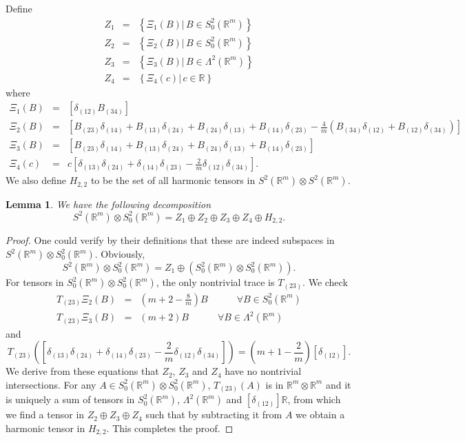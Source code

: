 \documentclass{amsart}
\newtheorem{lem}[thm]{Lemma}
\newcommand{\set}[1]{\left\{#1\right\}}
\newcommand{\Real}{\mathbb R}
\numberwithin{equation}{section}
\begin{document}
Define
\begin{eqnarray*}
	Z_1&=& \set{ \Xi_1(B)|\, B\in S^2_0(\Real^m)}\\
	Z_2&=& \set{ \Xi_2(B)|\, B\in S^2_0(\Real^m)}\\
	Z_3&=& \set{\Xi_3(B)|\, B\in \Lambda^2(\Real^m)}\\
	Z_4&=& \set{ \Xi_4(c)|\, c\in \Real} 
\end{eqnarray*}
where
\begin{eqnarray*}
	\Xi_1(B)&=& [\delta_{(12)}B_{(34)}] \\
	\Xi_2(B)&=& [B_{(23)}\delta_{(14)}+ B_{(13)}\delta_{(24)}+B_{(24)}\delta_{(13)}+B_{(14)}\delta_{(23)}-\frac{4}{m} (B_{(34)}\delta_{(12)}+B_{(12)}\delta_{(34)})]\\
	\Xi_3(B)&=& [B_{(23)}\delta_{(14)}+ B_{(13)}\delta_{(24)}+B_{(24)}\delta_{(13)}+B_{(14)}\delta_{(23)}]\\
	\Xi_4(c)&=& c[\delta_{(13)}\delta_{(24)}+\delta_{(14)}\delta_{(23)}-\frac{2}{m}\delta_{(12)}\delta_{(34)}].
\end{eqnarray*}
We also define $H_{2,2}$ to be the set of all harmonic tensors in $S^2(\Real^m)\otimes S^2(\Real^m)$.

\begin{lem}
	\label{lem:fulldecom}
	We have the following decomposition
	\[
		S^2(\Real^m)\otimes S^2_0(\Real^m) = Z_1\oplus Z_2 \oplus Z_3 \oplus Z_4 \oplus H_{2,2}.
	\]
\end{lem}
\begin{proof}
	One could verify by their definitions that these are indeed subspaces in $S^2(\Real^m)\otimes S^2_0(\Real^m)$. Obviously,
	\[
		S^2(\Real^m)\otimes S^2_0(\Real^m) =Z_1 \oplus (S^2_0(\Real^m)\otimes S^2_0(\Real^m)).
	\]
	For tensors in $S^2_0(\Real^m)\otimes S^2_0(\Real^m)$, the only nontrivial trace is $T_{(23)}$. We check
	\begin{eqnarray*}
		T_{(23)} \Xi_2(B)&=& (m+2-\frac{8}{m})B \qquad \text{} \quad \forall B\in S^2_0(\Real^m) \\
		T_{(23)} \Xi_3(B)&=& (m+2)B \qquad \text{} \quad \forall B\in \Lambda^2(\Real^m)
	\end{eqnarray*}
	and
	\[
		T_{(23)}( [\delta_{(13)}\delta_{(24)}+\delta_{(14)}\delta_{(23)}-\frac{2}{m}\delta_{(12)}\delta_{(34)}]) = (m+1-\frac{2}{m})[\delta_{(12)}].
	\]
	We derive from these equations that $Z_2$, $Z_3$ and $Z_4$ have no nontrivial intersections. For any $A\in S_0^2(\Real^m)\otimes S_0^2(\Real^m)$, $T_{(23)}(A)$ is in $\Real^m\otimes \Real^m$ and it is uniquely a sum of tensors in $S_0^2(\Real^m)$, $\Lambda^2(\Real^m)$ and $[\delta_{(12)}] \Real$, from which we find a tensor in $Z_2\oplus Z_3\oplus Z_4$ such that by subtracting it from $A$ we obtain a harmonic tensor in $H_{2,2}$. This completes the proof.
\end{proof}
\end{document}
